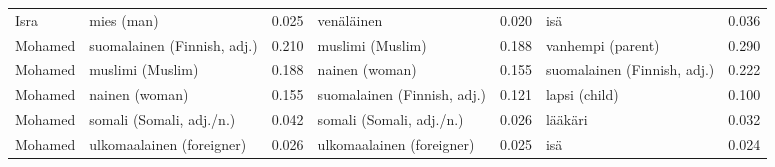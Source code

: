\begin{longtable}{llrlrlr}
   Isra &                  mies (man) &                            0.025 &                  venäläinen &                                 0.020 &                         isä &                           0.036 \\
Mohamed & suomalainen (Finnish, adj.) &                            0.210 &            muslimi (Muslim) &                                 0.188 &           vanhempi (parent) &                           0.290 \\
Mohamed &            muslimi (Muslim) &                            0.188 &              nainen (woman) &                                 0.155 & suomalainen (Finnish, adj.) &                           0.222 \\
Mohamed &              nainen (woman) &                            0.155 & suomalainen (Finnish, adj.) &                                 0.121 &               lapsi (child) &                           0.100 \\
Mohamed &    somali (Somali, adj./n.) &                            0.042 &    somali (Somali, adj./n.) &                                 0.026 &                     lääkäri &                           0.032 \\
Mohamed &   ulkomaalainen (foreigner) &                            0.026 &   ulkomaalainen (foreigner) &                                 0.025 &                         isä &                           0.024 \\
\end{longtable}
